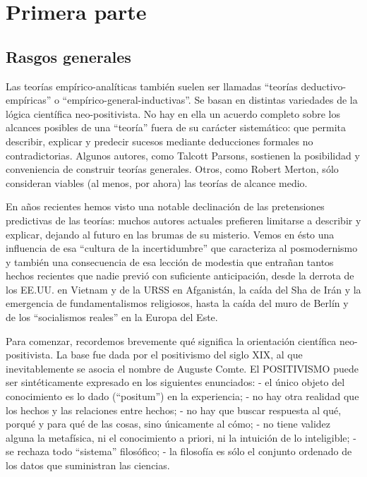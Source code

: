 \documentclass[
]{book}
\begin{document}
\hypertarget{primera-parte-2}{%
\section*{Primera parte}\label{primera-parte-2}}

\hypertarget{rasgos-generales-1}{%
\subsection*{Rasgos generales}\label{rasgos-generales-1}}

Las teorías empírico-analíticas también suelen ser llamadas ``teorías deductivo-empíricas'' o ``empírico-general-inductivas''. Se basan en distintas variedades de la lógica científica neo-positivista. No hay en ella un acuerdo completo sobre los alcances posibles de una ``teoría'' fuera de su carácter sistemático: que permita describir, explicar y predecir sucesos mediante deducciones formales no contradictorias. Algunos autores, como Talcott Parsons, sostienen la posibilidad y conveniencia de construir teorías generales. Otros, como Robert Merton, sólo consideran viables (al menos, por ahora) las teorías de alcance medio.

En años recientes hemos visto una notable declinación de las pretensiones predictivas de las teorías: muchos autores actuales prefieren limitarse a describir y explicar, dejando al futuro en las brumas de su misterio. Vemos en ésto una influencia de esa ``cultura de la incertidumbre'' que caracteriza al posmodernismo y también una consecuencia de esa lección de modestia que entrañan tantos hechos recientes que nadie previó con suficiente anticipación, desde la derrota de los EE.UU. en Vietnam y de la URSS en Afganistán, la caída del Sha de Irán y la emergencia de fundamentalismos religiosos, hasta la caída del muro de Berlín y de los ``socialismos reales'' en la Europa del Este.

Para comenzar, recordemos brevemente qué significa la orientación científica neo-positivista. La base fue dada por el positivismo del siglo XIX, al que inevitablemente se asocia el nombre de Auguste Comte. El POSITIVISMO puede ser sintéticamente expresado en los siguientes enunciados: - el único objeto del conocimiento es lo dado (``positum'') en la experiencia; - no hay otra realidad que los hechos y las relaciones entre hechos; - no hay que buscar respuesta al qué, porqué y para qué de las cosas, sino únicamente al cómo; - no tiene validez alguna la metafísica, ni el conocimiento a priori, ni la intuición de lo inteligible; - se rechaza todo ``sistema'' filosófico; - la filosofía es sólo el conjunto ordenado de los datos que suministran las ciencias.
\end{document}
